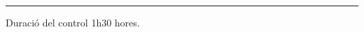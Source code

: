 \documentclass{report}
\begin{document}
\vspace{0.75 cm}

\hrule

\vspace{0.5 cm}

\noindent Duraci\'o del control 1h30 hores.\newline
\end{document}
